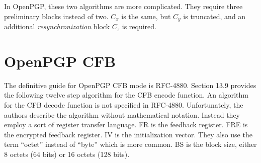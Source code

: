 \documentclass{article}
\begin{document}
In OpenPGP, these two algorithms are more complicated.
They require three preliminary blocks instead of two.
$C_x$ is the same, but $C_y$ is truncated, 
and an additional \emph{resynchronization} block $C_z$ is required.


\section*{OpenPGP CFB}

The definitive guide for OpenPGP CFB mode is RFC-4880.
Section 13.9 provides the following twelve step algorithm for the CFB encode function.
An algorithm for the CFB decode function is not specified in RFC-4880.
Unfortunately, the authors describe the algorithm without mathematical notation.
Instead they employ a sort of register transfer language.
FR is the feedback register. FRE is the encrypted feedback register.
IV is the initialization vector.
They also use the term ``octet'' instead of ``byte'' which is more common.
BS is the block size, either 8 octets (64 bits) or 16 octets (128 bits).
\end{document}
